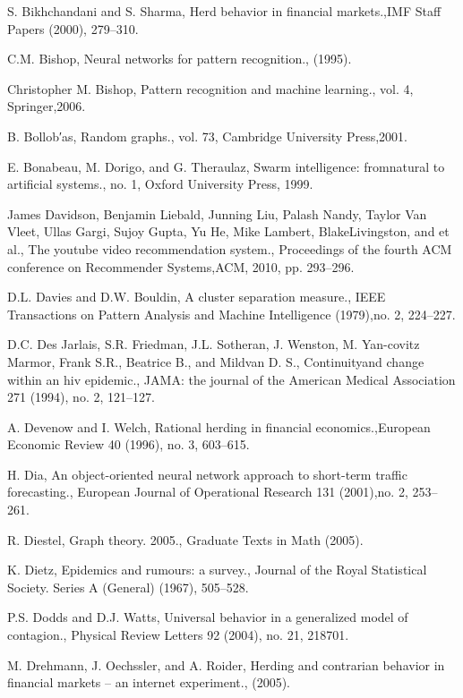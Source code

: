 \begin{thebibliography}{999}
 S. Bikhchandani and S. Sharma, Herd behavior in financial markets.,IMF Staff Papers (2000), 279–310.

 C.M. Bishop, Neural networks for pattern recognition., (1995).

 Christopher M. Bishop, Pattern recognition and machine learning., vol. 4, Springer,2006.

 B. Bollob′as, Random graphs., vol. 73, Cambridge University Press,2001.

 E. Bonabeau, M. Dorigo, and G. Theraulaz, Swarm intelligence: fromnatural to artificial systems., no. 1, Oxford University Press, 1999.

 James Davidson, Benjamin Liebald, Junning Liu, Palash Nandy, Taylor Van Vleet, Ullas Gargi, Sujoy Gupta, Yu He, Mike Lambert, BlakeLivingston, and et al., The youtube video recommendation system., Proceedings of the fourth ACM conference on Recommender Systems,ACM, 2010, pp. 293–296.

 D.L. Davies and D.W. Bouldin, A cluster separation measure., IEEE Transactions on Pattern Analysis and Machine Intelligence (1979),no. 2, 224–227.

 D.C. Des Jarlais, S.R. Friedman, J.L. Sotheran, J. Wenston, M. Yan-covitz Marmor, Frank S.R., Beatrice B., and Mildvan D. S., Continuityand change within an hiv epidemic., JAMA: the journal of the American Medical Association 271 (1994), no. 2, 121–127.

 A. Devenow and I. Welch, Rational herding in financial economics.,European Economic Review 40 (1996), no. 3, 603–615.

 H. Dia, An object-oriented neural network approach to short-term traffic forecasting., European Journal of Operational Research 131 (2001),no. 2, 253–261.

 R. Diestel, Graph theory. 2005., Graduate Texts in Math (2005).

 K. Dietz, Epidemics and rumours: a survey., Journal of the Royal Statistical Society. Series A (General) (1967), 505–528.

 P.S. Dodds and D.J. Watts, Universal behavior in a generalized model of contagion., Physical Review Letters 92 (2004), no. 21, 218701.

 M. Drehmann, J. Oechssler, and A. Roider, Herding and contrarian behavior in financial markets – an internet experiment., (2005).


\end{thebibliography}
